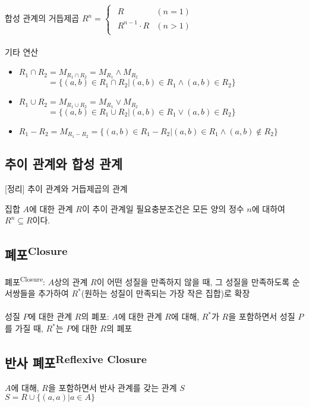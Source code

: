 합성 관계의 거듭제곱 $R^n = \begin{cases}
        \begin{array}{ll}
            R              & (n=1)   \\
            R^{n-1}\cdot R & (n > 1)
        \end{array}
    \end{cases}$
\\\\
기타 연산
\begin{itemize}
    \item $R_1 \cap R_2 = M_{R_1 \cap R_2} = M_{R_1} \land M_{R_2}$\\
          $\phantom{R_1 \cap R_2} = \{(a, b) \in R_1 \cap R_2 | (a, b) \in R_1 \land (a, b) \in R_2\}$
    \item $R_1 \cup R_2 = M_{R_1 \cup R_2} = M_{R_1} \lor M_{R_2}$\\
          $\phantom{R_1 \cup R_2} = \{(a, b) \in R_1 \cup R_2 | (a, b) \in R_1 \lor (a, b) \in R_2\}$
    \item $R_1 - R_2 = M_{R_1-R_2} = \{(a, b) \in R_1 - R_2 | (a, b) \in R_1 \land (a, b) \not\in R_2\}$
\end{itemize}

\subsection{추이 관계와 합성 관계}
[정리] 추이 관계와 거듭제곱의 관계

집합 $A$에 대한 관계 $R$이 추이 관계일 필요충분조건은 모든 양의 정수 $n$에 대하여 $R^n \subseteq R$이다.

\subsection{폐포\textsuperscript{Closure}}
폐포\textsuperscript{Closure}: $A$상의 관계 $R$이 어떤 성질을 만족하지 않을 때, 그 성질을 만족하도록 순서쌍들을 추가하여 $R^*$(원하는 성질이 만족되는 가장 작은 집합)로 확장\\\\
성질 $P$에 대한 관계 $R$의 폐포: $A$에 대한 관계 $R$에 대해, $R^*$가 $R$을 포함하면서 성질 $P$를 가질 때, $R^*$는 $P$에 대한 $R$의 폐포

\subsection{반사 폐포\textsuperscript{Reflexive Closure}}
$A$에 대해, $R$을 포함하면서 반사 관계를 갖는 관계 $S$\\
$S = R \cup \{(a, a)|a \in A\}$


